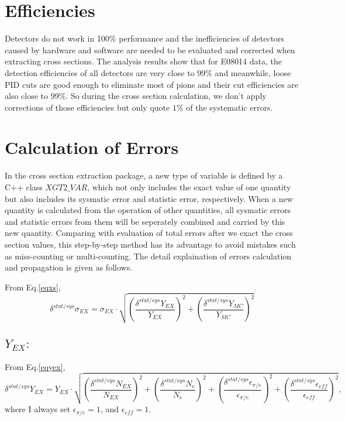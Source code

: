 \documentclass[a4paper,12.pt]{article}
\begin{document}
\section{Efficiencies}

Detectors do not work in 100\% performance and the inefficiencies of detectors caused by hardware and software are needed to be evaluated and corrected when extracting cross sections. The analysis results show that for E08014 data, the detection efficiencies of all detectors are very close to $99\%$ and meanwhile, loose PID cuts are good enough to eliminate most of pions and their cut efficiencies are also close to 99\%. So during the cross section calculation, we don't apply corrections of those efficiencies but only quote $1\%$ of the systematic errors.

\section{Calculation of Errors}
 In the cross section extraction package, a new type of variable is defined by a C++ class $XGT2\_VAR$, which not only includes the exact value of one quantity but also includes its sysmatic error and statistic error, respectively. When a new quantity is calculated from the operation of other quantities, all sysmatic errors and statistic errors from them will be seperately combined and carried by this new quantity. Comparing with evaluation of total errors after we exact the cross section values, this step-by-step method has its advantage to avoid mistakes such as miss-counting or multi-counting. The detail explaination of errors calculation and propagation is given as follows.

 From Eq.\ref{eqxs},
  \begin{equation}
  \delta^{stat/sys} \sigma_{EX} = \sigma_{EX} \cdot \sqrt{(\frac{\delta^{stat/sys} Y_{EX}}{Y_{EX}})^{2}+(\frac{\delta^{stat/sys} Y_{MC}}{Y_{MC}})^{2}}
\end{equation}

\subsection{$Y_{EX}:$}
 From Eq.\ref{eqyex},
\begin{equation}
  \delta^{stat/sys} Y_{EX} =  Y_{EX} \cdot \sqrt{(\frac{\delta^{stat/sys} N_{EX}}{N_{EX}})^{2}+(\frac{\delta^{stat/sys} N_{e}}{N_{e}})^{2}+(\frac{\delta^{stat/sys}\epsilon_{\pi/e}}{\epsilon_{\pi/e}})^{2}+(\frac{\delta^{stat/sys}\epsilon_{eff}}{\epsilon_{eff}})^{2}},
\end{equation}
where I always set $\epsilon_{\pi/e} = 1$, and $\epsilon_{eff} = 1$.
\end{document}
